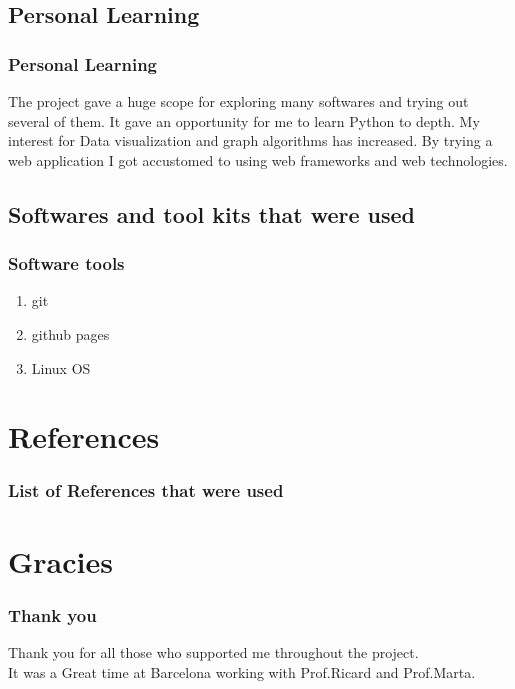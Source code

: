 \documentclass{beamer}
\begin{document}
\subsection{Personal Learning}
\frame
{
	\frametitle{Personal Learning}
The project gave a huge scope for exploring many softwares and trying out several of them. It gave an opportunity for me to learn Python to depth. My interest for Data visualization and graph algorithms has increased. By trying a web application I got accustomed to using web frameworks and web technologies. 
}

\subsection{Softwares and tool kits that were used}

\frame
{
	\frametitle{Software tools}
	\begin{enumerate}
		\item git
		\item github pages
		\item Linux OS
	\end{enumerate}
}



\section{References}

\frame
{
	\frametitle{List of References that were used}


{}
}

\section{Gracies}
\frame
{
	\frametitle{Thank you}
Thank you for all those who supported me throughout the project.\\
It was a Great time at Barcelona working with Prof.Ricard and Prof.Marta.

}
\end{document}
